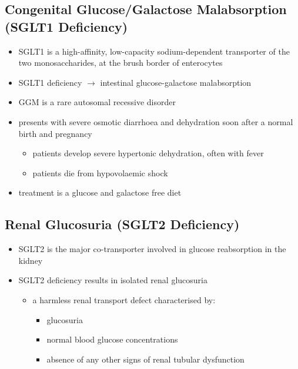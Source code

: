 \documentclass{scrartcl}
\begin{document}
\subsection{Congenital Glucose/Galactose Malabsorption (SGLT1 Deficiency)}
\label{sec:orgd0cc0ea}
\begin{itemize}
\item SGLT1 is a high-affinity, low-capacity sodium-dependent transporter
of the two monosaccharides, at the brush border of enterocytes
\item SGLT1 deficiency \(\to\) intestinal glucose-galactose malabsorption
\item GGM is a rare autosomal recessive disorder
\item presents with severe osmotic diarrhoea and dehydration soon after a
normal birth and pregnancy
\begin{itemize}
\item patients develop severe hypertonic dehydration, often with fever
\item patients die from hypovolaemic shock
\end{itemize}
\item treatment is a glucose and galactose free diet
\end{itemize}

\subsection{Renal Glucosuria (SGLT2 Deficiency)}
\label{sec:org092ef0d}
\begin{itemize}
\item SGLT2 is the major co-transporter involved in glucose reabsorption in
the kidney
\item SGLT2 deficiency results in isolated renal glucosuria
\begin{itemize}
\item a harmless renal transport defect characterised by:
\begin{itemize}
\item glucosuria
\item normal blood glucose concentrations
\item absence of any other signs of renal tubular dysfunction
\end{itemize}
\end{itemize}
\end{itemize}
\end{document}
